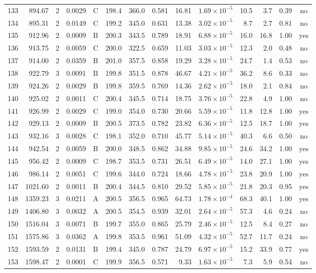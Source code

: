 \begin{landscape}
\begin{longtable}{rrrrlrrrrrrrrc}
133 & 894.67 & 2 & 0.0029 & C & 198.4 & 366.0 & 0.581 & 16.81 & $1.69\times10^{-5}$ & 10.5 & 3.7 & 0.39 & no \\
134 & 895.31 & 2 & 0.0149 & C & 199.2 & 345.0 & 0.631 & 13.38 & $3.02\times10^{-5}$ & 8.7 & 2.7 & 0.81 & no \\
135 & 912.96 & 2 & 0.0009 & B & 200.3 & 343.5 & 0.789 & 18.91 & $6.88\times10^{-5}$ & 16.0 & 16.8 & 1.00 & yes \\
136 & 913.75 & 2 & 0.0059 & C & 200.0 & 322.5 & 0.659 & 11.03 & $3.03\times10^{-5}$ & 12.3 & 2.0 & 0.48 & no \\
137 & 914.00 & 2 & 0.0359 & B & 201.0 & 357.5 & 0.858 & 19.29 & $3.28\times10^{-5}$ & 24.7 & 1.4 & 0.53 & no \\
138 & 922.79 & 3 & 0.0091 & B & 199.8 & 351.5 & 0.878 & 46.67 & $4.21\times10^{-5}$ & 36.2 & 8.6 & 0.33 & no \\
139 & 924.26 & 2 & 0.0029 & B & 199.8 & 359.5 & 0.769 & 14.36 & $2.62\times10^{-5}$ & 18.0 & 2.1 & 0.84 & no \\
140 & 925.02 & 2 & 0.0011 & C & 200.4 & 345.5 & 0.714 & 18.75 & $3.76\times10^{-5}$ & 22.8 & 4.9 & 1.00 & no \\
141 & 926.99 & 2 & 0.0029 & C & 199.0 & 354.0 & 0.730 & 20.66 & $5.59\times10^{-5}$ & 11.8 & 12.8 & 1.00 & yes \\
142 & 929.13 & 2 & 0.0009 & B & 200.5 & 373.5 & 0.782 & 23.82 & $6.36\times10^{-5}$ & 12.5 & 18.7 & 1.00 & yes \\
143 & 932.16 & 3 & 0.0028 & C & 198.1 & 352.0 & 0.710 & 45.77 & $5.14\times10^{-5}$ & 40.3 & 6.6 & 0.50 & no \\
144 & 942.54 & 2 & 0.0059 & B & 200.0 & 348.5 & 0.862 & 34.88 & $9.85\times10^{-5}$ & 24.6 & 34.2 & 1.00 & yes \\
145 & 956.42 & 2 & 0.0009 & C & 198.7 & 353.5 & 0.731 & 26.51 & $6.49\times10^{-5}$ & 14.0 & 27.1 & 1.00 & yes \\
146 & 986.14 & 2 & 0.0051 & C & 199.6 & 344.0 & 0.724 & 18.66 & $4.78\times10^{-5}$ & 23.8 & 20.9 & 1.00 & yes \\
147 & 1021.60 & 2 & 0.0011 & B & 200.4 & 344.5 & 0.810 & 29.52 & $5.85\times10^{-5}$ & 21.8 & 20.3 & 0.95 & yes \\
148 & 1359.23 & 3 & 0.0211 & A & 200.5 & 356.5 & 0.965 & 64.73 & $1.78\times10^{-4}$ & 68.3 & 40.1 & 1.00 & yes \\
149 & 1406.80 & 3 & 0.0032 & A & 200.5 & 354.5 & 0.939 & 32.01 & $2.64\times10^{-5}$ & 57.3 & 4.6 & 0.24 & no \\
150 & 1516.04 & 3 & 0.0071 & B & 199.7 & 355.0 & 0.865 & 25.79 & $2.46\times10^{-5}$ & 12.5 & 8.4 & 0.27 & no \\
151 & 1575.86 & 3 & 0.0362 & A & 199.8 & 353.5 & 0.961 & 51.09 & $4.32\times10^{-5}$ & 52.7 & 11.7 & 0.24 & no \\
152 & 1593.59 & 2 & 0.0131 & B & 199.4 & 345.0 & 0.787 & 24.79 & $6.97\times10^{-5}$ & 15.2 & 33.9 & 0.77 & yes \\
153 & 1598.47 & 2 & 0.0001 & C & 199.9 & 356.5 & 0.571 & 9.33 & $1.63\times10^{-5}$ & 7.3 & 5.9 & 0.54 & no \\
\end{longtable}
\end{landscape}
